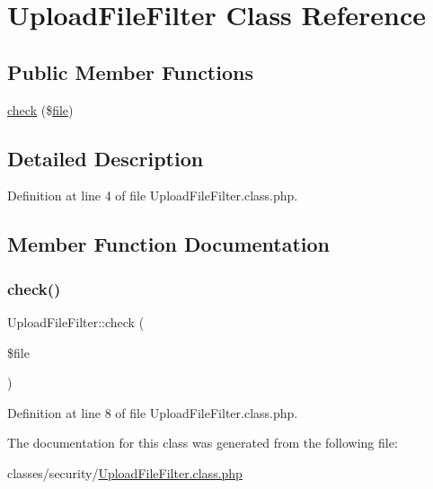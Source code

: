 \hypertarget{classUploadFileFilter}{}\section{Upload\+File\+Filter Class Reference}
\label{classUploadFileFilter}
\subsection*{Public Member Functions}
\begin{DoxyCompactItemize}
\item 
\hyperlink{classUploadFileFilter_a9032ac1f53f2e216125b53c4988adf6b}{check} (\$\hyperlink{classfile}{file})
\end{DoxyCompactItemize}


\subsection{Detailed Description}


Definition at line 4 of file Upload\+File\+Filter.\+class.\+php.



\subsection{Member Function Documentation}
\mbox{\label{classUploadFileFilter_a9032ac1f53f2e216125b53c4988adf6b}} 
\subsubsection{\texorpdfstring{check()}{check()}}
{\footnotesize\ttfamily Upload\+File\+Filter\+::check (\begin{DoxyParamCaption}\item[{}]{\$file }\end{DoxyParamCaption})}



Definition at line 8 of file Upload\+File\+Filter.\+class.\+php.



The documentation for this class was generated from the following file\+:\begin{DoxyCompactItemize}
\item 
classes/security/\hyperlink{UploadFileFilter_8class_8php}{Upload\+File\+Filter.\+class.\+php}\end{DoxyCompactItemize}
